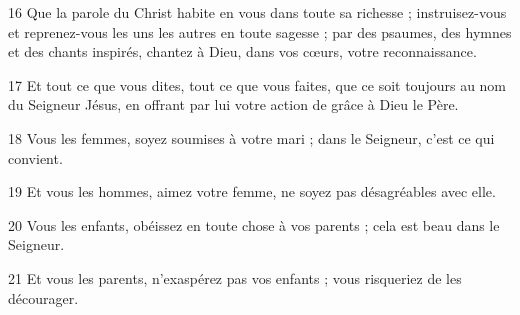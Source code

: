 
16 Que la parole du Christ habite en vous dans toute sa richesse ; instruisez-vous et reprenez-vous les uns les autres en toute sagesse ; par des psaumes, des hymnes et des chants inspirés, chantez à Dieu, dans vos cœurs, votre reconnaissance.

17 Et tout ce que vous dites, tout ce que vous faites, que ce soit toujours au nom du Seigneur Jésus, en offrant par lui votre action de grâce à Dieu le Père.

18 Vous les femmes, soyez soumises à votre mari ; dans le Seigneur, c’est ce qui convient.

19 Et vous les hommes, aimez votre femme, ne soyez pas désagréables avec elle.

20 Vous les enfants, obéissez en toute chose à vos parents ; cela est beau dans le Seigneur.

21 Et vous les parents, n’exaspérez pas vos enfants ; vous risqueriez de les décourager.
